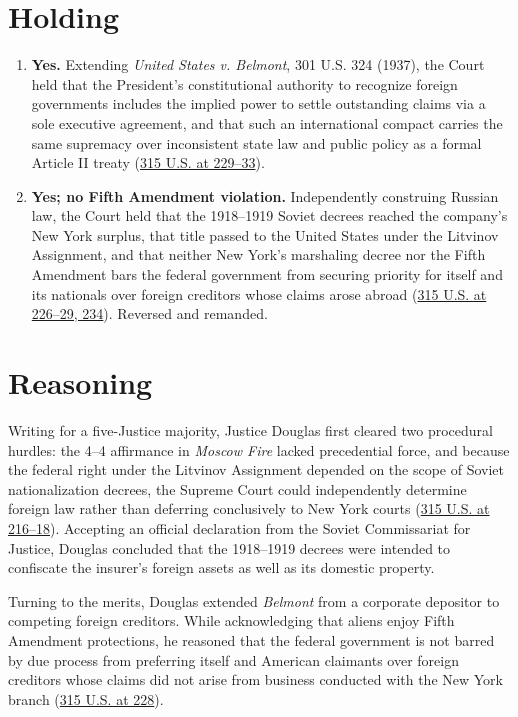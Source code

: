 \documentclass[12pt]{article}
\begin{document}
\section{Holding}
\begin{enumerate}
  \item \textbf{Yes.} Extending \textit{United States v. Belmont}, 301 U.S. 324 (1937), the Court held that the President's constitutional authority to recognize foreign governments includes the implied power to settle outstanding claims via a sole executive agreement, and that such an international compact carries the same supremacy over inconsistent state law and public policy as a formal Article II treaty (\href{https://supreme.justia.com/cases/federal/us/315/203/}{315 U.S. at 229--33}).
  \item \textbf{Yes; no Fifth Amendment violation.} Independently construing Russian law, the Court held that the 1918--1919 Soviet decrees reached the company's New York surplus, that title passed to the United States under the Litvinov Assignment, and that neither New York's marshaling decree nor the Fifth Amendment bars the federal government from securing priority for itself and its nationals over foreign creditors whose claims arose abroad (\href{https://supreme.justia.com/cases/federal/us/315/203/}{315 U.S. at 226--29, 234}). Reversed and remanded.
\end{enumerate}

\section{Reasoning}
Writing for a five-Justice majority, Justice Douglas first cleared two procedural hurdles: the 4--4 affirmance in \textit{Moscow Fire} lacked precedential force, and because the federal right under the Litvinov Assignment depended on the scope of Soviet nationalization decrees, the Supreme Court could independently determine foreign law rather than deferring conclusively to New York courts (\href{https://caselaw.findlaw.com/court/us-supreme-court/315/203.html}{315 U.S. at 216--18}). Accepting an official declaration from the Soviet Commissariat for Justice, Douglas concluded that the 1918--1919 decrees were intended to confiscate the insurer's foreign assets as well as its domestic property.

Turning to the merits, Douglas extended \textit{Belmont} from a corporate depositor to competing foreign creditors. While acknowledging that aliens enjoy Fifth Amendment protections, he reasoned that the federal government is not barred by due process from preferring itself and American claimants over foreign creditors whose claims did not arise from business conducted with the New York branch (\href{https://supreme.justia.com/cases/federal/us/315/203/}{315 U.S. at 228}).
\end{document}
